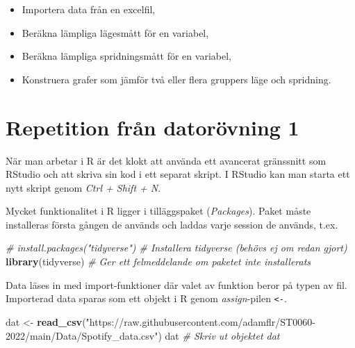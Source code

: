 \documentclass[
]{book}
\newenvironment{Shaded}{\begin{snugshade}}{\end{snugshade}}
\newcommand{\CommentTok}[1]{\textcolor[rgb]{0.56,0.35,0.01}{\textit{#1}}}
\newcommand{\FunctionTok}[1]{\textcolor[rgb]{0.13,0.29,0.53}{\textbf{#1}}}
\newcommand{\NormalTok}[1]{#1}
\newcommand{\OtherTok}[1]{\textcolor[rgb]{0.56,0.35,0.01}{#1}}
\newcommand{\StringTok}[1]{\textcolor[rgb]{0.31,0.60,0.02}{#1}}
\theoremstyle{definition}
\theoremstyle{definition}
\theoremstyle{definition}
\theoremstyle{definition}
\theoremstyle{remark}
\begin{document}
\begin{itemize}
\item
  Importera data från en excelfil,
\item
  Beräkna lämpliga lägesmått för en variabel,
\item
  Beräkna lämpliga spridningsmått för en variabel,
\item
  Konstruera grafer som jämför två eller flera gruppers läge och spridning.
\end{itemize}

\hypertarget{repetition-fruxe5n-datoruxf6vning-1}{%
\section{Repetition från datorövning 1}\label{repetition-fruxe5n-datoruxf6vning-1}}

När man arbetar i R är det klokt att använda ett avancerat gränssnitt som RStudio och att skriva sin kod i ett separat skript. I RStudio kan man starta ett nytt skript genom \emph{Ctrl + Shift + N}.

Mycket funktionalitet i R ligger i tilläggspaket (\emph{Packages}). Paket måste installeras första gången de används och laddas varje session de används, t.ex.

\begin{Shaded}
\begin{Highlighting}[]
\CommentTok{\# install.packages("tidyverse")        \# Installera tidyverse (behövs ej om redan gjort)}
\FunctionTok{library}\NormalTok{(tidyverse)                     }\CommentTok{\# Ger ett felmeddelande om paketet inte installerats}
\end{Highlighting}
\end{Shaded}

Data läses in med import-funktioner där valet av funktion beror på typen av fil. Importerad data sparas som ett objekt i R genom \emph{assign}-pilen \texttt{\textless{}-}.

\begin{Shaded}
\begin{Highlighting}[]
\NormalTok{dat }\OtherTok{\textless{}{-}} \FunctionTok{read\_csv}\NormalTok{(}\StringTok{"https://raw.githubusercontent.com/adamflr/ST0060{-}2022/main/Data/Spotify\_data.csv"}\NormalTok{)}
\NormalTok{dat                                              }\CommentTok{\# Skriv ut objektet dat}
\end{Highlighting}
\end{Shaded}
\end{document}
